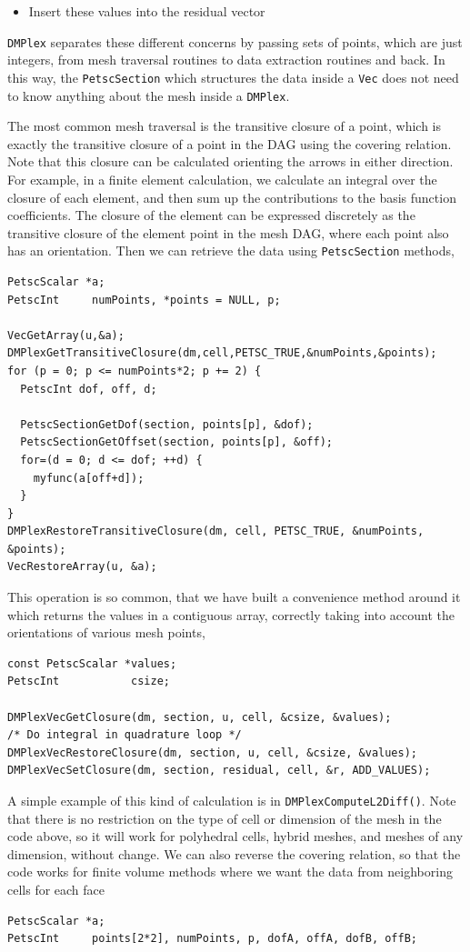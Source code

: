 {\begin{itemize}
  \item Insert these values into the residual vector
\end{itemize}
\lstinline{DMPlex} separates these different concerns by passing sets of points, which are just integers, from mesh traversal
routines to data extraction routines and back. In this way, the \lstinline{PetscSection} which structures the data inside a \lstinline{Vec} does
not need to know anything about the mesh inside a \lstinline{DMPlex}.

The most common mesh traversal is the transitive closure of a point, which is exactly the transitive closure of a point
in the DAG using the covering relation. Note that this closure can be calculated orienting the arrows in either
direction. For example, in a finite element calculation, we calculate an integral over the closure of each element, and
then sum up the contributions to the basis function coefficients. The closure of the element can be expressed discretely
as the transitive closure of the element point in the mesh DAG, where each point also has an orientation. Then we can
retrieve the data using \lstinline{PetscSection} methods,
\begin{lstlisting}
PetscScalar *a;
PetscInt     numPoints, *points = NULL, p;

VecGetArray(u,&a);
DMPlexGetTransitiveClosure(dm,cell,PETSC_TRUE,&numPoints,&points);
for (p = 0; p <= numPoints*2; p += 2) {
  PetscInt dof, off, d;

  PetscSectionGetDof(section, points[p], &dof);
  PetscSectionGetOffset(section, points[p], &off);
  for=(d = 0; d <= dof; ++d) {
    myfunc(a[off+d]);
  }
}
DMPlexRestoreTransitiveClosure(dm, cell, PETSC_TRUE, &numPoints, &points);
VecRestoreArray(u, &a);
\end{lstlisting}
This operation is so common, that we have built a convenience method around it which returns the values in a contiguous
array, correctly taking into account the orientations of various mesh points,
\begin{lstlisting}
const PetscScalar *values;
PetscInt           csize;

DMPlexVecGetClosure(dm, section, u, cell, &csize, &values);
/* Do integral in quadrature loop */
DMPlexVecRestoreClosure(dm, section, u, cell, &csize, &values);
DMPlexVecSetClosure(dm, section, residual, cell, &r, ADD_VALUES);
\end{lstlisting}
A simple example of this kind of calculation is in \lstinline{DMPlexComputeL2Diff()}. Note that there is no restriction on the
type of cell or dimension of the mesh in the code above, so it will work for polyhedral cells, hybrid meshes, and meshes
of any dimension, without change. We can also reverse the covering relation, so that the code works for finite volume
methods where we want the data from neighboring cells for each face
\begin{lstlisting}
PetscScalar *a;
PetscInt     points[2*2], numPoints, p, dofA, offA, dofB, offB;


\end{lstlisting}}
